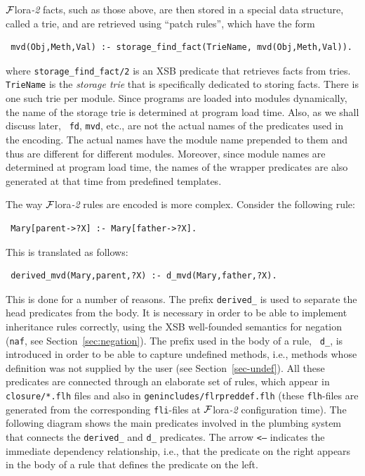 \documentclass[11pt]{article}
\newcommand{\FLORA}{{\mbox{\sc ${\cal F}${lora}\rm\emph{-2}}}\xspace}
\newcommand{\SILKNAF}{{{\tt naf}}\xspace}
\begin{document}
\FLORA facts, such as those above, are then stored in a special data structure,
called a {\rm trie}, and are retrieved using  ``patch rules'', which have the
form
\begin{verbatim}
 mvd(Obj,Meth,Val) :- storage_find_fact(TrieName, mvd(Obj,Meth,Val)).  
\end{verbatim}
where {\tt storage\_find\_fact/2} is an XSB predicate that retrieves facts
from tries. {\tt TrieName} is the \emph{storage trie} that is specifically
dedicated to storing facts. There is one such trie per module. Since
programs are loaded into modules dynamically, the name of the storage trie
is determined at program load time. Also, as we shall discuss later, {\tt
  fd}, {\tt mvd}, etc., are not the actual names of the predicates used in
the encoding. The actual names have the module name prepended to them and
thus are different for different modules. Moreover, since module names are
determined at program load time, the names of the wrapper predicates are
also generated at that time from predefined templates.

The way \FLORA rules are encoded is more complex. Consider the following rule:
\begin{verbatim}
 Mary[parent->?X] :- Mary[father->?X].  
\end{verbatim}
This is translated as follows:
\begin{verbatim}
 derived_mvd(Mary,parent,?X) :- d_mvd(Mary,father,?X).  
\end{verbatim}
This is done for a number of reasons. The prefix {\tt derived\_} is used to
separate the head predicates from the body. It is necessary in order to
be able to implement inheritance rules correctly, using the XSB
well-founded semantics for negation (\SILKNAF, see
Section~\ref{sec:negation}). The prefix used in the body of a rule, {\tt
  d\_}, is introduced in order to be able to capture undefined methods,
i.e., methods whose definition was not supplied by the user (see
Section~\ref{sec-undef}). All these predicates are connected through an
elaborate set of rules, which appear in {\tt closure/*.flh} files and also
in {\tt genincludes/flrpreddef.flh} (these {\tt flh}-files are generated
from the corresponding {\tt fli}-files at \FLORA configuration time).
The following diagram shows the main
predicates involved in the plumbing system that connects
the {\tt derived\_} and {\tt d\_} predicates. The arrow {\tt <---} indicates the
immediate dependency relationship, i.e., that the predicate on the
right appears in the body of a rule that defines the predicate on the left.
\end{document}
